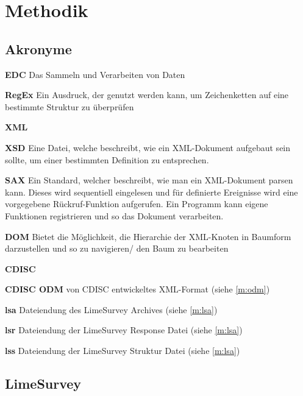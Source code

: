 \chapter{Methodik}
\label{ch:methodik}

\section{Akronyme}

\begin{description}[font=\sffamily\bfseries, leftmargin=0cm, itemsep=-0.15cm, style=nextline]
	\item \textbf{EDC}  Das Sammeln und Verarbeiten von Daten
	\item \textbf{RegEx}  Ein Ausdruck, der genutzt werden kann, um Zeichenketten auf eine bestimmte Struktur zu überprüfen
	\item \textbf{XML} 
	\item \textbf{XSD}  Eine Datei, welche beschreibt, wie ein XML-Dokument aufgebaut sein sollte, um einer bestimmten Definition zu entsprechen.
	\item \textbf{SAX}  Ein Standard, welcher beschreibt, wie man ein XML-Dokument parsen kann. Dieses wird sequentiell eingelesen und für definierte Ereignisse wird eine vorgegebene Rückruf-Funktion aufgerufen. Ein Programm kann eigene Funktionen registrieren und so das Dokument verarbeiten.
	\item \textbf{DOM}  Bietet die Möglichkeit, die Hierarchie der XML-Knoten in Baumform darzustellen und so zu navigieren/ den Baum zu bearbeiten
	\item \textbf{CDISC} 
	\item \textbf{CDISC ODM}  von CDISC entwickeltes XML-Format (siehe \cref{m:odm})
	\item \textbf{lsa} Dateiendung des LimeSurvey Archives (siehe \cref{m:lsa})
	\item \textbf{lsr} Dateiendung der LimeSurvey Response Datei (siehe \cref{m:lsa})
	\item \textbf{lss} Dateiendung der LimeSurvey Struktur Datei (siehe \cref{m:lsa})
\end{description}

\section{LimeSurvey}

